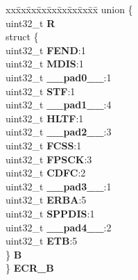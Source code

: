 \begin{DoxyCompactItemize}
\begin{tabbing}
\end{tabbing}\item 
\mbox{\label{structETPU__tag_aa992564727ae1d4780f1217a823254b3}} 
\begin{tabbing}
xx\=xx\=xx\=xx\=xx\=xx\=xx\=xx\=xx\=\kill
union \{\\
\>uint32\_t {\bfseries R}\\
\>struct \{\\
\>\>uint32\_t {\bfseries FEND}:1\\
\>\>uint32\_t {\bfseries MDIS}:1\\
\>\>uint32\_t {\bfseries \_\_pad0\_\_}:1\\
\>\>uint32\_t {\bfseries STF}:1\\
\>\>uint32\_t {\bfseries \_\_pad1\_\_}:4\\
\>\>uint32\_t {\bfseries HLTF}:1\\
\>\>uint32\_t {\bfseries \_\_pad2\_\_}:3\\
\>\>uint32\_t {\bfseries FCSS}:1\\
\>\>uint32\_t {\bfseries FPSCK}:3\\
\>\>uint32\_t {\bfseries CDFC}:2\\
\>\>uint32\_t {\bfseries \_\_pad3\_\_}:1\\
\>\>uint32\_t {\bfseries ERBA}:5\\
\>\>uint32\_t {\bfseries SPPDIS}:1\\
\>\>uint32\_t {\bfseries \_\_pad4\_\_}:2\\
\>\>uint32\_t {\bfseries ETB}:5\\
\>\} {\bfseries B}\\
\} {\bfseries ECR\_B}\\


\end{tabbing}
\end{DoxyCompactItemize}
